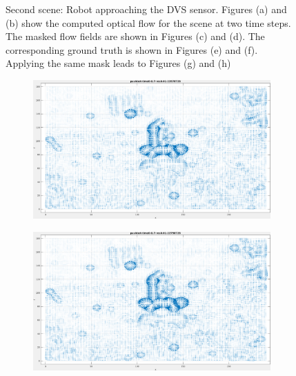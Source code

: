 \begin{appendix}
\begin{figure}[tb]
\begin{subfigure}{.45\textwidth}
  \caption{}
\end{subfigure}
\caption[First scene: Robot approaching the DVS sensor.]{Second scene: Robot approaching the DVS sensor.
Figures (a) and (b) show the computed optical flow for the scene at two time steps. The masked flow fields are shown in Figures (c) and (d).
The corresponding ground truth is shown in Figures (e) and (f). Applying the same mask leads to Figures (g) and (h)}
\label{fig:app_quadrat-snapshots}
\end{figure}



\begin{figure}[tb]
\centering
\begin{subfigure}{.45\textwidth}
  \centering
  \includegraphics[height=.6\linewidth]{figs/pushbot/pushbot-1.png}
  \caption{}
\end{subfigure}
\begin{subfigure}{.45\textwidth}
  \centering
  \includegraphics[height=.6\linewidth]{figs/pushbot/pushbot-2.png}
  \caption{}
\end{subfigure}

\end{figure}
\end{appendix}
